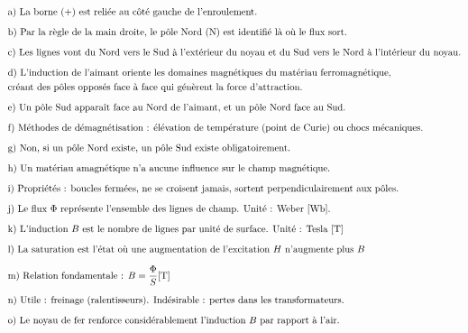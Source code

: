\documentclass[a4paper,11pt,answers,addpoints]{exam}
\begin{document}
\begin{questions}
\begin{solution}
\begin{align*}
	&\text{a) La borne (+) est reliée au côté gauche de l'enroulement.} \\[6pt]
	&\text{b) Par la règle de la main droite, le pôle Nord (N) est identifié là où le flux sort.} \\[6pt]
	&\text{c) Les lignes vont du Nord vers le Sud à l'extérieur du noyau et du Sud vers le Nord à l'intérieur du noyau.} \\[6pt]
	&\text{d) L'induction de l'aimant oriente les domaines magnétiques du matériau ferromagnétique, } \\
	&\text{créant des pôles opposés face à face qui génèrent la force d'attraction.} \\[6pt]
	&\text{e) Un pôle Sud apparaît face au Nord de l'aimant, et un pôle Nord face au Sud.} \\[6pt]
	&\text{f) Méthodes de démagnétisation : élévation de température (point de Curie) ou chocs mécaniques.} \\[6pt]
	&\text{g) Non, si un pôle Nord existe, un pôle Sud existe obligatoirement.} \\[6pt]
	&\text{h) Un matériau amagnétique n'a aucune influence sur le champ magnétique.} \\[6pt]
	&\text{i) Propriétés : boucles fermées, ne se croisent jamais, sortent perpendiculairement aux pôles.} \\[6pt]
	&\text{j) Le flux } \Phi \text{ représente l'ensemble des lignes de champ. Unité : Weber \qty{}{[\weber]}.} \\[6pt]
	&\text{k) L'induction } B \text{ est le nombre de lignes par unité de surface. Unité : Tesla \qty{}{[T]}} \\[6pt]
	&\text{l) La saturation est l'état où une augmentation de l'excitation } H \text{ n'augmente plus } B  \\[6pt]
	&\text{m) Relation fondamentale : } B = \dfrac{\Phi}{S} \unit{[\tesla]} \\[6pt]
	&\text{n) Utile : freinage (ralentisseurs). Indésirable : pertes dans les transformateurs.} \\[6pt]
	&\text{o) Le noyau de fer renforce considérablement l'induction } B \text{ par rapport à l'air.}
\end{align*}
\end{solution}	
\end{questions}
\end{document}
